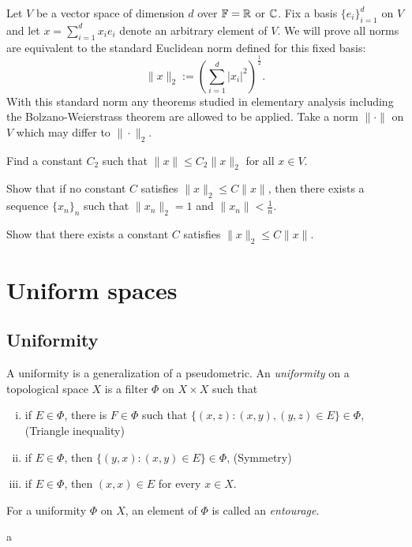 \documentclass{../../large}
\begin{document}
\begin{prb}
Let $V$ be a vector space of dimension $d$ over $\mathbb{F}=\mathbb{R}$ or $\mathbb{C}$.
Fix a basis $\{e_i\}_{i=1}^d$ on $V$ and let $x=\sum_{i=1}^dx_ie_i$ denote an arbitrary element of $V$.
We will prove all norms are equivalent to the standard Euclidean norm defined for this fixed basis:
\[\|x\|_2:=(\sum_{i=1}^d|x_i|^2)^{\frac12}.\]
With this standard norm any theorems studied in elementary analysis including the Bolzano-Weierstrass theorem are allowed to be applied.
Take a norm $\|\cdot\|$ on $V$ which may differ to $\|\cdot\|_2$.
\begin{parts}
\item Find a constant $C_2$ such that $\|x\|\le C_2\|x\|_2$ for all $x\in V$.
\item Show that if no constant $C$ satisfies $\|x\|_2\le C\|x\|$, then there exists a sequence $\{x_n\}_n$ such that $\|x_n\|_2=1$ and $\|x_n\|<\tfrac1n$.
\item Show that there exists a constant $C$ satisfies $\|x\|_2\le C\|x\|$.
\end{parts}
\end{prb}


\chapter{Uniform spaces}

\section{Uniformity}

\begin{prb}
A uniformity is a generalization of a pseudometric.
An \emph{uniformity} on a topological space $X$ is a filter $\Phi$ on $X\times X$ such that
\begin{enumerate}[(i)]
\item if $E\in\Phi$, there is $F\in\Phi$ such that $\{(x,z):(x,y),(y,z)\in E\}\in\Phi$, \hfill(Triangle inequality)
\item if $E\in\Phi$, then $\{(y,x):(x,y)\in E\}\in\Phi$, \hfill(Symmetry)
\item if $E\in\Phi$, then $(x,x)\in E$ for every $x\in X$.
\end{enumerate}
For a uniformity $\Phi$ on $X$, an element of $\Phi$ is called an \emph{entourage}.
\begin{parts}
\item a
\end{parts}
\end{prb}
\end{document}
